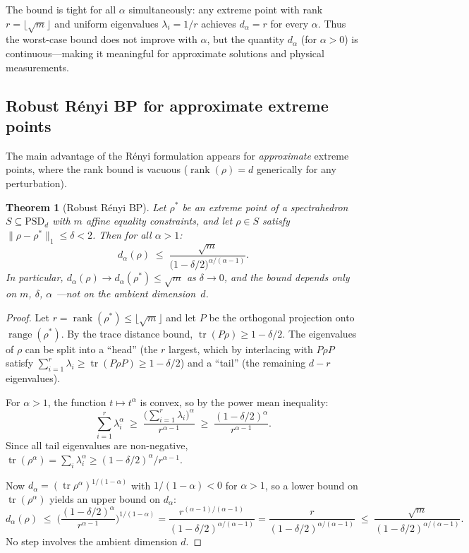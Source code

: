 \documentclass[11pt,a4paper]{article}
\newtheorem{theorem}{Theorem}
\theoremstyle{definition}
\begin{document}
The bound is tight for all $\alpha$ simultaneously: any extreme point with
rank $r = \lfloor\sqrt{m}\rfloor$ and uniform eigenvalues $\lambda_i = 1/r$
achieves $d_\alpha = r$ for every $\alpha$.  Thus the worst-case bound does
not improve with $\alpha$, but the quantity $d_\alpha$ (for $\alpha > 0$) is
continuous---making it meaningful for approximate solutions and physical
measurements.

\subsection{Robust R\'enyi BP for approximate extreme points}

The main advantage of the R\'enyi formulation appears for
\emph{approximate} extreme points, where the rank bound is vacuous
($\operatorname{rank}(\rho) = d$ generically for any perturbation).

\begin{theorem}[Robust R\'enyi BP]
\label{thm:robust_renyi}
Let\/ $\rho^*$ be an extreme point of a spectrahedron $S \subseteq
\mathrm{PSD}_d$ with $m$ affine equality constraints, and let
$\rho \in S$ satisfy $\|\rho - \rho^*\|_1 \leq \delta < 2$.
Then for all $\alpha > 1$:
\begin{equation}\label{eq:robust_renyi}
  d_\alpha(\rho) \;\leq\;
  \frac{\sqrt{m}}{\bigl(1 - \delta/2\bigr)^{\alpha/(\alpha-1)}}.
\end{equation}
In particular, $d_\alpha(\rho) \to d_\alpha(\rho^*) \leq \sqrt{m}$
as $\delta \to 0$, and the bound depends only on $m$, $\delta$, $\alpha$
---not on the ambient dimension~$d$.
\end{theorem}

\begin{proof}
Let $r = \operatorname{rank}(\rho^*) \leq \lfloor\sqrt{m}\rfloor$ and let
$P$ be the orthogonal projection onto $\operatorname{range}(\rho^*)$.
By the trace distance bound, $\operatorname{tr}(P\rho) \geq 1 - \delta/2$.
The eigenvalues of $\rho$ can be split into a ``head'' (the $r$ largest,
which by interlacing with $P\rho P$ satisfy
$\sum_{i=1}^r \lambda_i \geq \operatorname{tr}(P\rho P) \geq 1 - \delta/2$)
and a ``tail'' (the remaining $d - r$ eigenvalues).

For $\alpha > 1$, the function $t \mapsto t^\alpha$ is convex, so by the
power mean inequality:
\[
  \sum_{i=1}^r \lambda_i^\alpha
  \;\geq\; \frac{\bigl(\sum_{i=1}^r \lambda_i\bigr)^\alpha}{r^{\alpha-1}}
  \;\geq\; \frac{(1 - \delta/2)^\alpha}{r^{\alpha-1}}.
\]
Since all tail eigenvalues are non-negative,
$\operatorname{tr}(\rho^\alpha) = \sum_i \lambda_i^\alpha
\geq (1-\delta/2)^\alpha / r^{\alpha-1}$.

Now $d_\alpha = (\operatorname{tr}\rho^\alpha)^{1/(1-\alpha)}$ with
$1/(1-\alpha) < 0$ for $\alpha > 1$, so a lower bound on
$\operatorname{tr}(\rho^\alpha)$ yields an upper bound on $d_\alpha$:
\[
  d_\alpha(\rho) \;\leq\;
  \biggl(\frac{(1-\delta/2)^\alpha}{r^{\alpha-1}}\biggr)^{\!1/(1-\alpha)}
  = \frac{r^{(\alpha-1)/(\alpha-1)}}{(1-\delta/2)^{\alpha/(\alpha-1)}}
  = \frac{r}{(1-\delta/2)^{\alpha/(\alpha-1)}}
  \;\leq\; \frac{\sqrt{m}}{(1-\delta/2)^{\alpha/(\alpha-1)}}.
\]
No step involves the ambient dimension $d$.
\end{proof}
\end{document}
